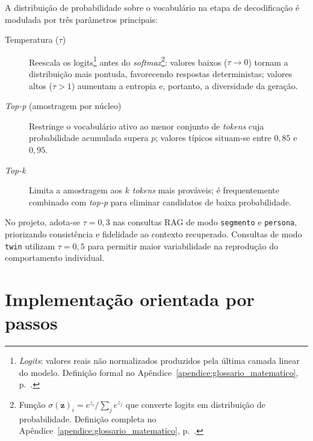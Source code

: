 A distribui\c{c}\~ao de probabilidade sobre o vocabul\'ario na etapa de
decodifica\c{c}\~ao \'e modulada por tr\^es par\^ametros principais:

\begin{description}
  \item[Temperatura ($\tau$)] Reescala os logits\footnote{%
        \textit{Logits}: valores reais n\~ao normalizados produzidos pela
        \'ultima camada linear do modelo. Defini\c{c}\~ao formal no
        Ap\^endice~\ref{apendice:glossario_matematico}, p.~\pageref{sec:logits}.}
        antes do
        \textit{softmax}\footnote{%
        Fun\c{c}\~ao $\sigma(\mathbf{z})_i = e^{z_i}/\sum_j e^{z_j}$
        que converte logits em distribui\c{c}\~ao de probabilidade. Defini\c{c}\~ao
        completa no Ap\^endice~\ref{apendice:glossario_matematico},
        p.~\pageref{sec:softmax}.}: valores baixos ($\tau \to 0$) tornam a
        distribui\c{c}\~ao mais pontuda, favorecendo respostas
        deterministas; valores altos ($\tau > 1$) aumentam a entropia
        e, portanto, a diversidade da gera\c{c}\~ao.
  \item[\textit{Top-p} (amostragem por n\'ucleo)] Restringe o
        vocabul\'ario ativo ao menor conjunto de \textit{tokens} cuja
        probabilidade acumulada supera $p$; valores t\'ipicos situam-se
        entre $0,85$ e $0,95$.
  \item[\textit{Top-k}] Limita a amostragem aos $k$ \textit{tokens}
        mais prov\'aveis; \'e frequentemente combinado com
        \textit{top-p} para eliminar candidatos de baixa probabilidade.
\end{description}

No projeto, adota-se $\tau = 0{,}3$ nas consultas RAG de modo
\texttt{segmento} e \texttt{persona}, priorizando consist\^encia
e fidelidade ao contexto recuperado. Consultas de modo
\texttt{twin} utilizam $\tau = 0{,}5$ para permitir maior
variabilidade na reprodu\c{c}\~ao do comportamento individual.

\section{Implementa\c{c}\~ao orientada por passos}

